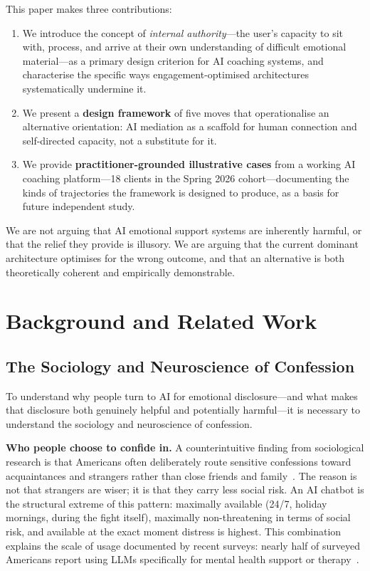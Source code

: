 \documentclass[sigchi,review,anonymous]{acmart}
\begin{document}
This paper makes three contributions:
\begin{enumerate}[leftmargin=*]
  \item We introduce the concept of \emph{internal authority}---the user's capacity to sit
        with, process, and arrive at their own understanding of difficult emotional
        material---as a primary design criterion for AI coaching systems, and characterise
        the specific ways engagement-optimised architectures systematically undermine it.
  \item We present a \textbf{design framework} of five moves that operationalise an
        alternative orientation: AI mediation as a scaffold for human connection and
        self-directed capacity, not a substitute for it.
  \item We provide \textbf{practitioner-grounded illustrative cases} from a working AI
        coaching platform---18 clients in the Spring 2026 cohort---documenting the kinds of
        trajectories the framework is designed to produce, as a basis for future independent
        study.
\end{enumerate}

We are not arguing that AI emotional support systems are inherently harmful, or that the
relief they provide is illusory. We are arguing that the current dominant architecture
optimises for the wrong outcome, and that an alternative is both theoretically coherent and
empirically demonstrable.

\section{Background and Related Work}

\subsection{The Sociology and Neuroscience of Confession}

To understand why people turn to AI for emotional disclosure---and what makes that disclosure
both genuinely helpful and potentially harmful---it is necessary to understand the sociology
and neuroscience of confession.

\textbf{Who people choose to confide in.}
A counterintuitive finding from sociological research is that Americans often deliberately
route sensitive confessions toward acquaintances and strangers rather than close friends and
family~\cite{small2017someone}. The reason is not that strangers are wiser; it is that they
carry less social risk. An AI chatbot is the structural extreme of this pattern: maximally
available (24/7, holiday mornings, during the fight itself), maximally non-threatening in
terms of social risk, and available at the exact moment distress is highest. This combination
explains the scale of usage documented by recent surveys: nearly half of surveyed Americans
report using LLMs specifically for mental health support or
therapy~\cite{rousmaniere2025llm}.
\end{document}
